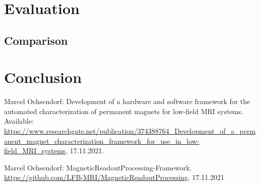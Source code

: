 \documentclass[conference]{IEEEtran}
\begin{document}

\section{Evaluation}

\subsection{Comparison}


\section{Conclusion}


\begingroup
\begin{thebibliography}{00}
 Marcel Ochsendorf: Development of a hardware and software framework for the automated characterization of permanent magnets for low-field MRI systems. Available: \url{https://www.researchgate.net/publication/374388764_Development_of_a_permanent_magnet_characterization_framework_for_use_in_low-field_MRI_systems}, 17.11.2021.

\vskip 0.05in
 Marcel Ochsendorf: MagneticReadoutProcessing-Framework. \url{https://github.com/LFB-MRI/MagneticReadoutProcessing}, 17.11.2021


\end{thebibliography}
\endgroup
\end{document}
